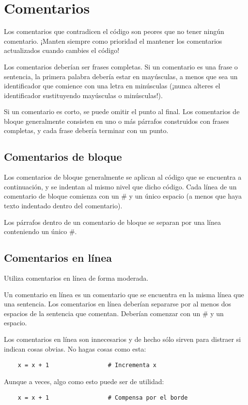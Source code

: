 \documentclass[a4paper,11pt,oneside]{book}
\begin{document}
\section{Comentarios}
Los comentarios que contradicen el código son peores que no tener ningún comentario. ¡Manten siempre como prioridad el mantener los comentarios actualizados cuando cambies el código!

Los comentarios deberían ser frases completas. Si un comentario es una frase o sentencia, la primera palabra debería estar en mayúsculas, a menos que sea un identificador que comience con una letra en minúsculas (¡nunca alteres el identificador sustituyendo mayúsculas o minúsculas!).

Si un comentario es corto, se puede omitir el punto al final. Los comentarios de bloque generalmente consisten en uno o más párrafos construidos con frases completas, y cada frase debería terminar con un punto.
\subsection{Comentarios de bloque}
Los comentarios de bloque generalmente se aplican al código que se encuentra a continuación, y se indentan al mismo nivel que dicho código. Cada línea de un comentario de bloque comienza con un \# y un único espacio (a menos que haya texto indentado dentro del comentario).

Los párrafos dentro de un comentario de bloque se separan por una línea conteniendo un único \#.
\subsection{Comentarios en línea}
Utiliza comentarios en línea de forma moderada.

Un comentario en línea es un comentario que se encuentra en la misma línea que una sentencia. Los comentarios en línea deberían separarse por al menos dos espacios de la sentencia que comentan. Deberían comenzar con un \# y un espacio.

Los comentarios en línea son innecesarios y de hecho sólo sirven para distraer si indican cosas obvias. No hagas cosas como esta:
\begin{lstlisting}
    x = x + 1                 # Incrementa x
\end{lstlisting}
Aunque a veces, algo como esto puede ser de utilidad:
\begin{lstlisting}
    x = x + 1                 # Compensa por el borde
\end{lstlisting}
\end{document}

